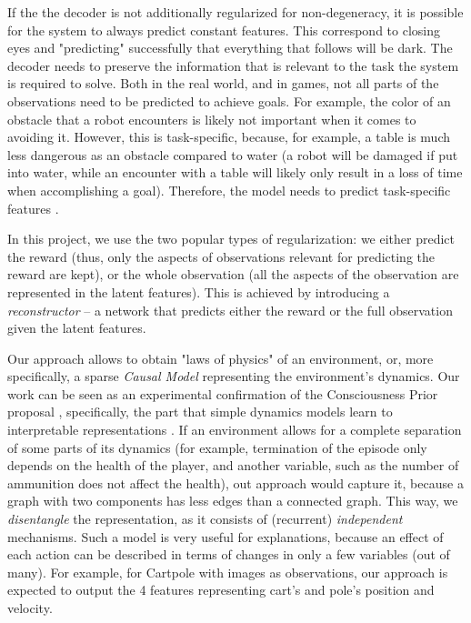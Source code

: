 \documentclass[a4paper,11pt,oneside]{report}
\begin{document}
If the the decoder is not additionally regularized for non-degeneracy, it is possible for the system to always predict constant features. This correspond to closing eyes and "predicting" successfully that everything that follows will be dark. The decoder needs to preserve the information that is relevant to the task the system is required to solve. Both in the real world, and in games, not all parts of the observations need to be predicted to achieve goals. For example, the color of an obstacle that a robot encounters is likely not important when it comes to avoiding it. However, this is task-specific, because, for example, a table is much less dangerous as an obstacle compared to water (a robot will be damaged if put into water, while an encounter with a table will likely only result in a loss of time when accomplishing a goal). Therefore, the model needs to predict task-specific features \cite{Cortese2020}.

In this project, we use the two popular types of regularization: we either predict the reward (thus, only the aspects of observations relevant for predicting the reward are kept), or the whole observation (all the aspects of the observation are represented in the latent features). This is achieved by introducing a {\em reconstructor} -- a network that predicts either the reward or the full observation given the latent features.

Our approach allows to obtain "laws of physics" of an environment, or, more specifically, a sparse {\em Causal Model} \cite{Pearl2020,Wong2020} representing the environment's dynamics.
Our work can be seen as an experimental confirmation of the Consciousness Prior proposal \cite{Bengio2017}, specifically, the part that simple dynamics models learn to interpretable representations \cite{Barcelo2020,Cranmer2020,Goyal2021}.
If an environment allows for a complete separation of some parts of its dynamics (for example, termination of the episode only depends on the health of the player, and another variable, such as the number of ammunition does not affect the health), out approach would capture it, because a graph with two components has less edges than a connected graph. This way, we {\em disentangle} the representation, as it consists of (recurrent) {\em independent} mechanisms.
Such a model is very useful for explanations, because an effect of each action can be described in terms of changes in only a few variables (out of many). For example, for Cartpole with images as observations, our approach is expected to output the 4 features representing cart's and pole's position and velocity.
\end{document}
